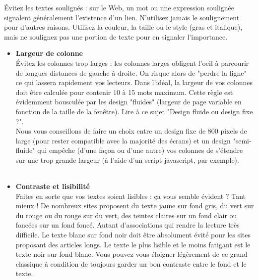\documentclass[11pt,twoside,a4paper]{article}
\begin{document}
{\ttfamily%
{\footnotesize%

\begin{minipage}[t]{18cm} 

{\'E}vitez les textes soulign{\'e}s : sur le Web, un mot ou une expression soulign{\'e}e signalent g{\'e}n{\'e}ralement l'existence d'un lien. N'utilisez jamais le soulignement pour d'autres raisons. Utilisez la couleur, la taille ou le style (gras et italique), mais ne soulignez pas une portion de texte pour en signaler l'importance.

\begin{itemize}
	\item[] \textbf{Largeur de colonne }~\\
	{\'E}vitez les colonnes trop larges : les colonnes larges obligent l'oeil {\`a} parcourir de longues distances de gauche {\`a} droite. On risque alors de "perdre la ligne" ce qui lassera rapidement vos lecteurs. Dans l'id{\'e}al, la largeur de vos colonnes doit {\^e}tre calcul{\'e}e pour contenir 10 {\`a} 15 mots maximum. Cette r{\`e}gle est {\'e}videmment bouscul{\'e}e par les design "fluides" (largeur de page variable en fonction de la taille de la fen{\^e}tre). Lire {\`a} ce sujet "Design fluide ou design fixe ?".~\\
	Nous vous conseillons de faire un choix entre un design fixe de 800 pixels de large (pour rester compatible avec la majorit{\'e} des {\'e}crans) et un design "semi-fluide" qui emp{\^e}che (d'une fa\c{c}on ou d'une autre) vos colonnes de s'{\'e}tendre sur une trop grande largeur ({\`a} l'aide d'un script javascript, par exemple).~\\~\\

	\item[] \textbf{Contraste et lisibilit{\'e}}~\\
	Faites en sorte que vos textes soient lisibles : \c{c}a vous semble {\'e}vident ? Tant mieux ! De nombreux sites proposent du texte jaune sur fond gris, du vert sur du rouge ou du rouge sur du vert, des teintes claires sur un fond clair ou fonc{\'e}es sur un fond fonc{\'e}. Autant d'associations qui rendre la lecture tr{\`e}s difficile. Le texte blanc sur fond noir doit {\^e}tre absolument {\'e}vit{\'e} pour les sites proposant des articles longs. Le texte le plus lisible et le moins fatigant est le texte noir sur fond blanc. Vous pouvez vous {\'e}loigner l{\'e}g{\`e}rement de ce grand classique {\`a} condition de toujours garder un bon contraste entre le fond et le texte.~\\~\\


\end{itemize}
\end{minipage}}}
\end{document}

